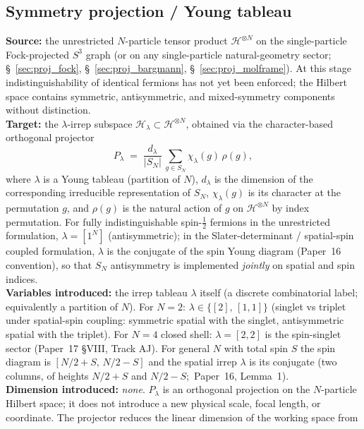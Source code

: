 \documentclass[11pt]{article}
\begin{document}
\subsection{Symmetry projection / Young tableau}
\label{sec:proj_symmetry_tableau}
\textbf{Source:} the unrestricted $N$-particle tensor product
$\mathcal{H}^{\otimes N}$ on the single-particle Fock-projected $S^3$
graph (or on any single-particle natural-geometry sector;
\S~\ref{sec:proj_fock}, \S~\ref{sec:proj_bargmann},
\S~\ref{sec:proj_molframe}).  At this stage indistinguishability of
identical fermions has not yet been enforced; the Hilbert space
contains symmetric, antisymmetric, and mixed-symmetry components
without distinction.\\
\textbf{Target:} the $\lambda$-irrep subspace
$\mathcal{H}_\lambda \subset \mathcal{H}^{\otimes N}$, obtained via
the character-based orthogonal projector
\[
  P_\lambda \;=\; \frac{d_\lambda}{|S_N|}\,\sum_{g \in S_N}
                  \chi_\lambda(g)\,\rho(g),
\]
where $\lambda$ is a Young tableau (partition of $N$), $d_\lambda$ is
the dimension of the corresponding irreducible representation of
$S_N$, $\chi_\lambda(g)$ is its character at the permutation $g$, and
$\rho(g)$ is the natural action of $g$ on $\mathcal{H}^{\otimes N}$
by index permutation.  For fully indistinguishable spin-$\tfrac{1}{2}$
fermions in the unrestricted formulation, $\lambda = [1^N]$
(antisymmetric); in the Slater-determinant / spatial-spin coupled
formulation, $\lambda$ is the conjugate of the spin Young diagram
(Paper~16 convention), so that $S_N$
antisymmetry is implemented \emph{jointly} on spatial and spin
indices.\\
\textbf{Variables introduced:} the irrep tableau $\lambda$ itself
(a discrete combinatorial label; equivalently a partition of $N$).
For $N=2$: $\lambda \in \{[2],\,[1,1]\}$ (singlet vs triplet under
spatial-spin coupling: symmetric spatial with the singlet,
antisymmetric spatial with the triplet).  For $N=4$ closed shell: $\lambda = [2,2]$
is the spin-singlet sector (Paper~17 §VIII, Track AJ).  For general
$N$ with total spin $S$ the spin diagram is $[N/2 + S,\, N/2 - S]$
and the spatial irrep $\lambda$ is its conjugate (two columns, of
heights $N/2 + S$ and $N/2 - S$;\ Paper~16, Lemma~1).\\
\textbf{Dimension introduced:} \emph{none}.  $P_\lambda$ is an
orthogonal projection on the $N$-particle Hilbert space; it does not
introduce a new physical scale, focal length, or coordinate.  The
projector reduces the linear dimension of the working space from
\end{document}
